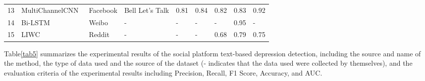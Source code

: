 \begin{table*}
\begin{tabular}{l|l|ll|lllll}
13                                      & MultiChannelCNN~\cite{orabi2018deep}                           & Facebook                       & Bell Let’s Talk             & 0.81                          & 0.84                       & 0.82                         & 0.83                         & 0.92                    \\
14                                      & Bi-LSTM~\cite{hu2021depression}                                & Weibo                          & -                           & -                             & -                          & -                            & 0.95                         & -                       \\
15                                      & LIWC~\cite{wolohan2018detecting}                               & Reddit                         & -                           & -                             & -                          & 0.68                         & 0.79                         & 0.75                   \\
\hline
\end{tabular}
\end{table*}


Table\ref{tab5} summarizes the experimental results of the social platform text-based depression detection, including the source and name of the method, the type of data used and the source of the dataset (- indicates that the data used were collected by themselves), and the evaluation criteria of the experimental results including Precision, Recall, F1 Score, Accuracy, and AUC.


\ifx\allfiles\undefined

\fi 
